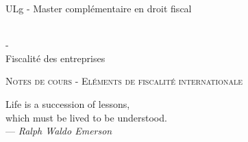 \documentclass{book}
\begin{document}
\sffamily
\newcommand{\RPoint}{\protect\texttt{[image: point.png]}}
\newcommand{\RSave}{\protect\texttt{[image: Save.png]}}
\renewcommand\labelitemii{\ding{220}}
\begin{titlepage}

\begin{center}
\begin{Large}ULg - Master complémentaire en droit fiscal\end{Large}\\
\vspace{0.5cm}- \\
\vspace{0.5cm}
Fiscalité des entreprises

\end{center}
\vspace{6cm}

\LARGE
\begin{center}
\textsc{Notes de cours - Eléments de fiscalité internationale}\\
\end{center}

\vspace{10.0cm}

\normalsize
{}

\end{titlepage}

\newpage

\thispagestyle{empty}
\setcounter{page}{0}
\null

\newpage
\thispagestyle{empty}
\setcounter{page}{0}
\vspace{20cm}

\vfill
\begin{flushright}
Life is a succession of lessons, \\
which must be lived to be understood. \\ 
--- \textit{Ralph Waldo Emerson}
\end{flushright}
\vfill
\newpage

\renewcommand{\chaptermark}[1]{\markboth{#1}{}}
\renewcommand{\sectionmark}[1]{\markright{\thesection\ #1}}
\fancyhf{} \fancyhead[LE,RO]{\bfseries\thepage}
\fancyhead[LO]{\bfseries\rightmark}
\fancyhead[RE]{\bfseries\leftmark}
\renewcommand{\headrulewidth}{0.5pt}
\addtolength{\headheight}{0.5pt}
\renewcommand{\footrulewidth}{0pt}
\fancypagestyle{plain}{ \fancyhead{}
\renewcommand{\headrulewidth}{0pt}}
\end{document}
